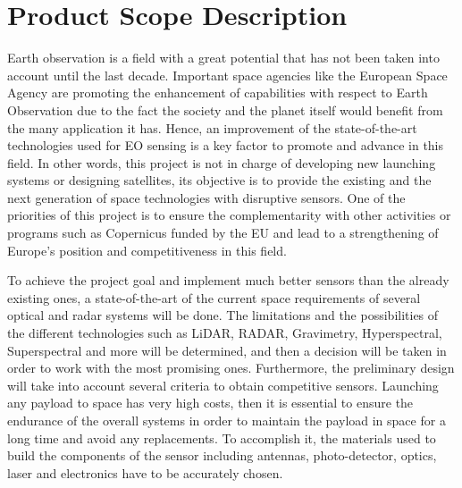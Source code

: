 \section{Product Scope Description}

Earth observation is a field with a great potential that has not been taken into account until the last decade. Important space agencies like the European Space Agency are promoting the enhancement of capabilities with respect to Earth Observation due to the fact the society and the planet itself would benefit from the many application it has. Hence, an improvement of the state-of-the-art technologies used for EO sensing is a key factor to promote and advance in this field. In other words, this project is not in charge of developing new launching systems or designing satellites, its objective is to provide the existing and the next generation of space technologies with disruptive sensors. One of the priorities of this project is to ensure the complementarity with other activities or programs such as Copernicus funded by the EU and lead to a strengthening of Europe's position and competitiveness in this field.

To achieve the project goal and implement much better sensors than the already existing ones, a state-of-the-art of the current space requirements of several optical and radar systems will be done. The limitations and the possibilities of the different technologies such as LiDAR, RADAR, Gravimetry, Hyperspectral, Superspectral and more will be determined, and then a decision will be taken in order to work with the most promising ones. Furthermore, the preliminary design will take into account several criteria to obtain competitive sensors. Launching any payload to space has very high costs, then it is essential to ensure the endurance of the overall systems in order to maintain the payload in space for a long time and avoid any replacements. To accomplish it, the materials used to build the components of the sensor including antennas, photo-detector, optics, laser and electronics have to be accurately chosen.

